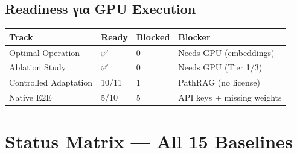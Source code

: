 \documentclass[11pt,a4paper]{article}
\begin{document}
\subsection*{Readiness για GPU Execution}

\begin{center}
\small
\begin{tabularx}{\linewidth}{@{}L{4.5cm} C{1.5cm} C{1.5cm} X@{}}
\toprule
\textbf{Track} & \textbf{Ready} & \textbf{Blocked} & \textbf{Blocker} \\
\midrule
Optimal Operation & ✅ & 0 & Needs GPU (embeddings) \\
Ablation Study & ✅ & 0 & Needs GPU (Tier 1/3) \\
Controlled Adaptation & 10/11 & 1 & PathRAG (no license) \\
Native E2E & 5/10 & 5 & API keys + missing weights \\
\bottomrule
\end{tabularx}
\end{center}

\section{Status Matrix — All 15 Baselines}
\end{document}
